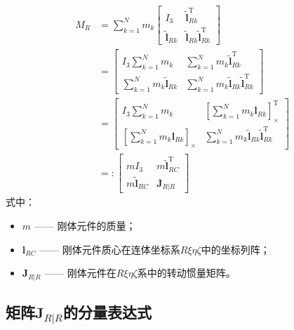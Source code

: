 \begin{align}
M_R &= \sum_{k=1}^{N} m_k
\begin{bmatrix}
I_3          & \tilde{\boldsymbol{l}}_{Rk}^{\mathrm{T}} \\[4pt]
\tilde{\boldsymbol{l}}_{Rk} & \tilde{\boldsymbol{l}}_{Rk}\tilde{\boldsymbol{l}}_{Rk}^{\mathrm{T}}
\end{bmatrix} \nonumber\\
&= \begin{bmatrix}
I_3\displaystyle\sum_{k=1}^{N}m_k & \displaystyle\sum_{k=1}^{N}m_k\tilde{\boldsymbol{l}}_{Rk}^{\mathrm{T}} \\[14pt]
\displaystyle\sum_{k=1}^{N}m_k\tilde{\boldsymbol{l}}_{Rk} & \displaystyle\sum_{k=1}^{N}m_k\tilde{\boldsymbol{l}}_{Rk}\tilde{\boldsymbol{l}}_{Rk}^{\mathrm{T}}
\end{bmatrix} \nonumber\\
&=
\begin{bmatrix}
I_3\displaystyle\sum_{k=1}^{N}m_k & \left[\displaystyle\sum_{k=1}^{N}m_k\boldsymbol{l}_{Rk}\right]^{\mathrm{T}}_{\times} \\[14pt]
\left[\displaystyle\sum_{k=1}^{N}m_k\boldsymbol{l}_{Rk}\right]_{\times} & \displaystyle\sum_{k=1}^{N}m_k\tilde{\boldsymbol{l}}_{Rk}\tilde{\boldsymbol{l}}_{Rk}^{\mathrm{T}}
\end{bmatrix} \nonumber\\
&=:
\begin{bmatrix}
m I_3              & m\tilde{\boldsymbol{l}}_{RC}^{\mathrm{T}} \\[4pt]
m\tilde{\boldsymbol{l}}_{RC} & \boldsymbol{J}_{R|R}
\end{bmatrix}
\label{eq:8.7}
\end{align}
式中：
\begin{itemize}
\item $m$ —— 刚体元件的质量；
\item $\boldsymbol{l}_{RC}$ —— 刚体元件质心在连体坐标系$R\xi\eta\zeta$中的坐标列阵；
\item $\boldsymbol{J}_{R|R}$ —— 刚体元件在$R\xi\eta\zeta$系中的转动惯量矩阵。
\end{itemize}

\subsection*{矩阵$\boldsymbol{J}_{R|R}$的分量表达式}

